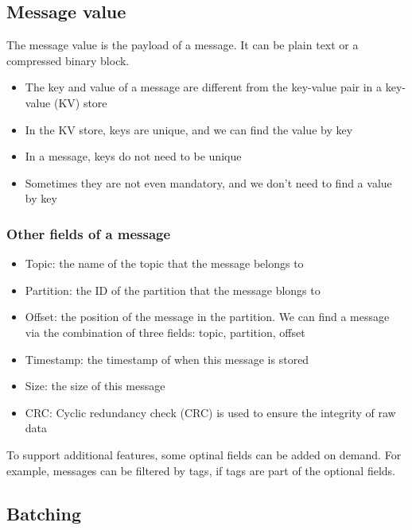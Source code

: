 \documentclass{report}
\newenvironment{defbox}[1]{%
  \tcolorbox[
    colback=black!5,
    colframe=darkgray,
    title=#1
  ]
}{%
  \endtcolorbox
}
\theoremstyle{definition}
\let\oldsubsection\subsection
\let\oldsubsubsection\subsubsection
\renewcommand{\subsection}{\oldsubsection*}
\renewcommand{\subsubsection}{\oldsubsubsection*}
\begin{document}
\subsection{Message value}

The message value is the payload of a message. It can be plain text or a compressed binary block.

\begin{defbox}{Reminder}
\begin{itemize}
\item
The key and value of a message are different from the key-value pair in a key-value (KV) store
\item
In the KV store, keys are unique, and we can find the value by key
\item
In a message, keys do not need to be unique
\item
Sometimes they are not even mandatory, and we don't need to find a value by key
\end{itemize}
\end{defbox}

\subsubsection{Other fields of a message}

\begin{itemize}
\item
Topic: the name of the topic that the message belongs to
\item
Partition: the ID of the partition that the message blongs to
\item
Offset: the position of the message in the partition. We can find a message via the combination of three fields: topic, partition, offset
\item
Timestamp: the timestamp of when this message is stored
\item
Size: the size of this message
\item
CRC: Cyclic redundancy check (CRC) is used to ensure the integrity of raw data
\end{itemize}

To support additional features, some optinal fields can be added on demand. For example, messages can be filtered by tags, if tags are part of the optional fields.

\subsection{Batching}
\end{document}
